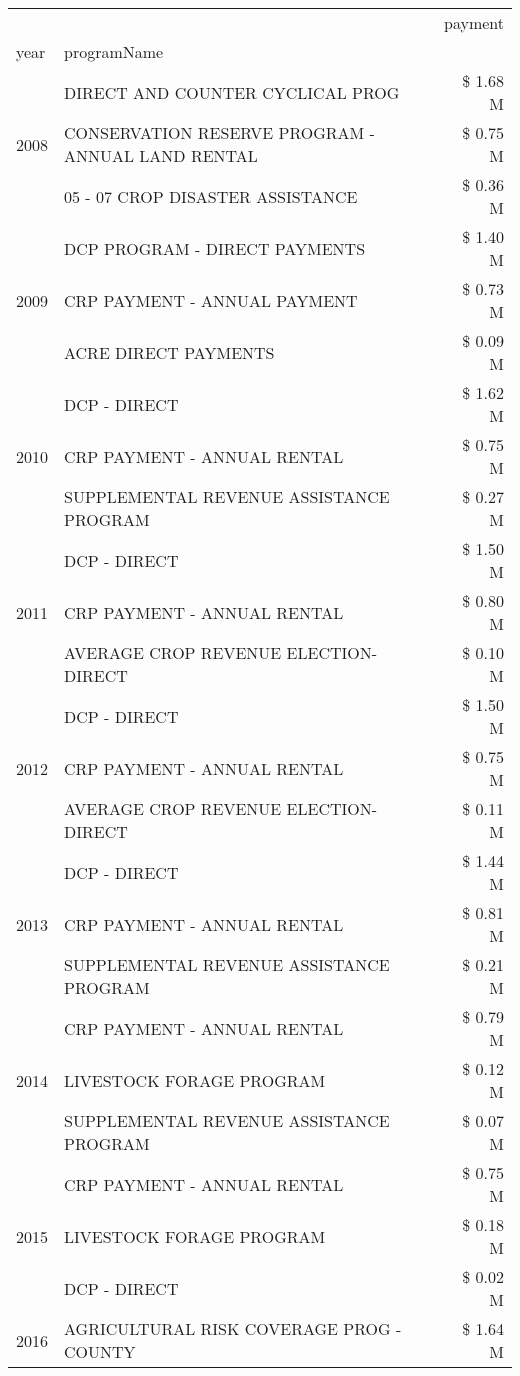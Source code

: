 \begin{tabular}{llr}
\toprule
 &  & payment \\
year & programName &  \\
\midrule
\multirow[t]{3}{*}{2008} & DIRECT AND COUNTER CYCLICAL PROG & \$ 1.68 M \\
 & CONSERVATION RESERVE PROGRAM - ANNUAL LAND RENTAL & \$ 0.75 M \\
 & 05 - 07 CROP DISASTER ASSISTANCE & \$ 0.36 M \\
\cline{1-3}
\multirow[t]{3}{*}{2009} & DCP PROGRAM - DIRECT PAYMENTS & \$ 1.40 M \\
 & CRP PAYMENT - ANNUAL PAYMENT & \$ 0.73 M \\
 & ACRE DIRECT PAYMENTS & \$ 0.09 M \\
\cline{1-3}
\multirow[t]{3}{*}{2010} & DCP - DIRECT & \$ 1.62 M \\
 & CRP PAYMENT - ANNUAL RENTAL & \$ 0.75 M \\
 & SUPPLEMENTAL REVENUE ASSISTANCE PROGRAM & \$ 0.27 M \\
\cline{1-3}
\multirow[t]{3}{*}{2011} & DCP - DIRECT & \$ 1.50 M \\
 & CRP PAYMENT - ANNUAL RENTAL & \$ 0.80 M \\
 & AVERAGE CROP REVENUE ELECTION-DIRECT & \$ 0.10 M \\
\cline{1-3}
\multirow[t]{3}{*}{2012} & DCP - DIRECT & \$ 1.50 M \\
 & CRP PAYMENT - ANNUAL RENTAL & \$ 0.75 M \\
 & AVERAGE CROP REVENUE ELECTION-DIRECT & \$ 0.11 M \\
\cline{1-3}
\multirow[t]{3}{*}{2013} & DCP - DIRECT & \$ 1.44 M \\
 & CRP PAYMENT - ANNUAL RENTAL & \$ 0.81 M \\
 & SUPPLEMENTAL REVENUE ASSISTANCE PROGRAM & \$ 0.21 M \\
\cline{1-3}
\multirow[t]{3}{*}{2014} & CRP PAYMENT - ANNUAL RENTAL & \$ 0.79 M \\
 & LIVESTOCK FORAGE PROGRAM & \$ 0.12 M \\
 & SUPPLEMENTAL REVENUE ASSISTANCE PROGRAM & \$ 0.07 M \\
\cline{1-3}
\multirow[t]{3}{*}{2015} & CRP PAYMENT - ANNUAL RENTAL & \$ 0.75 M \\
 & LIVESTOCK FORAGE PROGRAM & \$ 0.18 M \\
 & DCP - DIRECT & \$ 0.02 M \\
\cline{1-3}
\multirow[t]{3}{*}{2016} & AGRICULTURAL RISK COVERAGE PROG - COUNTY & \$ 1.64 M \\

\end{tabular}
